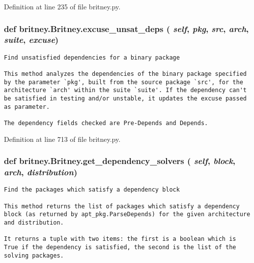 Definition at line 235 of file britney.py.
\subsubsection{\setlength{\rightskip}{0pt plus 5cm}def britney.Britney.excuse\_\-unsat\_\-deps ( {\em self},  {\em pkg},  {\em src},  {\em arch},  {\em suite},  {\em excuse})}\label{classbritney_1_1Britney_f51c60a69f3a9dc2bc5afdb2ffaf3990}




\footnotesize\begin{verbatim}Find unsatisfied dependencies for a binary package

This method analyzes the dependencies of the binary package specified
by the parameter `pkg', built from the source package `src', for the
architecture `arch' within the suite `suite'. If the dependency can't
be satisfied in testing and/or unstable, it updates the excuse passed
as parameter.

The dependency fields checked are Pre-Depends and Depends.
\end{verbatim}
\normalsize
 

Definition at line 713 of file britney.py.
\subsubsection{\setlength{\rightskip}{0pt plus 5cm}def britney.Britney.get\_\-dependency\_\-solvers ( {\em self},  {\em block},  {\em arch},  {\em distribution})}\label{classbritney_1_1Britney_5461f49e3e75a251ebedfd37d2a5ff0c}




\footnotesize\begin{verbatim}Find the packages which satisfy a dependency block

This method returns the list of packages which satisfy a dependency
block (as returned by apt_pkg.ParseDepends) for the given architecture
and distribution.

It returns a tuple with two items: the first is a boolean which is
True if the dependency is satisfied, the second is the list of the
solving packages.
\end{verbatim}
\normalsize
 

